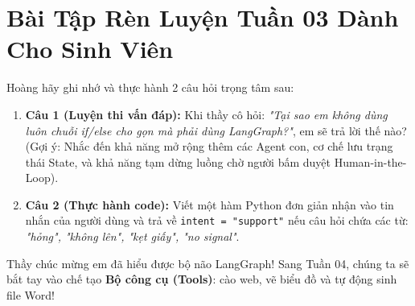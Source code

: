 \documentclass[11pt,a4paper]{article}
\begin{document}
\section{Bài Tập Rèn Luyện Tuần 03 Dành Cho Sinh Viên}

Hoàng hãy ghi nhớ và thực hành 2 câu hỏi trọng tâm sau:

\begin{enumerate}
    \item \textbf{Câu 1 (Luyện thi vấn đáp):} Khi thầy cô hỏi: \textit{"Tại sao em không dùng luôn chuỗi if/else cho gọn mà phải dùng LangGraph?"}, em sẽ trả lời thế nào? (Gợi ý: Nhắc đến khả năng mở rộng thêm các Agent con, cơ chế lưu trạng thái State, và khả năng tạm dừng luồng chờ người bấm duyệt Human-in-the-Loop).
    \item \textbf{Câu 2 (Thực hành code):} Viết một hàm Python đơn giản nhận vào tin nhắn của người dùng và trả về \texttt{intent = "support"} nếu câu hỏi chứa các từ: \textit{"hỏng", "không lên", "kẹt giấy", "no signal"}.
\end{enumerate}

Thầy chúc mừng em đã hiểu được bộ não LangGraph! Sang Tuần 04, chúng ta sẽ bắt tay vào chế tạo \textbf{Bộ công cụ (Tools)}: cào web, vẽ biểu đồ và tự động sinh file Word!
\end{document}

